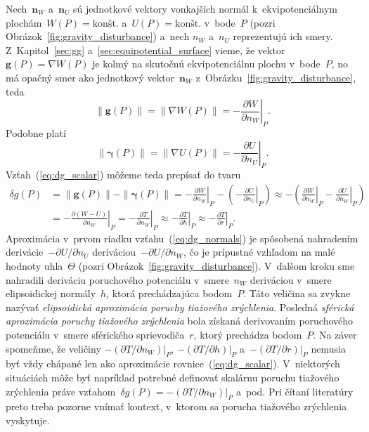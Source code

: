 \documentclass[a4paper, 12pt]{book}
\let\vec\mathbf
\begin{document}
Nech~$\vec n_W$ a~$\vec n_U$ sú jednotkové vektory vonkajších normál 
k~ekvipotenciálnym plochám~$W(P) = \textrm{konšt.}$ a~$U(P) = \textrm{konšt.}$ 
v~bode~$P$ (pozri Obrázok~\ref{fig:gravity_disturbance}) a~nech $n_W$ a~$n_U$ 
reprezentujú ich smery.  Z~Kapitol~\ref{sec:gg} 
a~\ref{sec:equipotential_surface} vieme, že vektor~$\vec g(P) = \nabla W(P)$ je 
kolmý na skutočnú ekvipotenciálnu plochu v~bode~$P$, no má opačný smer ako 
jednotkový vektor~$\vec n_W$ z~Obrázku~\ref{fig:gravity_disturbance}, teda
%
\begin{equation}
\| \vec g(P) \| = \| \nabla W(P) \| = -\left.\frac{\partial W}{\partial 
n_W}\right|_P.
\end{equation}
%
Podobne platí
%
\begin{equation}
\| \boldsymbol \gamma(P) \| = \| \nabla U(P) \| = -\left.\frac{\partial 
U}{\partial n_U}\right|_P.
\end{equation}
%
Vzťah~(\ref{eq:dg_scalar}) môžeme teda prepísať do tvaru
%
\begin{equation}
\label{eq:dg_normals}
\begin{split}
\delta g(P) &= \| \vec g(P) \| - \| \boldsymbol\gamma(P) \| 
= -\left.\frac{\partial W}{\partial n_W}\right|_P - \left( 
- \left.\frac{\partial U}{\partial n_U}\right|_P\right) \approx -\left( 
\left.\frac{\partial W}{\partial n_W}\right|_P - \left.\frac{\partial 
U}{\partial n_W}\right|_P\right)\\
%
&= -\left.\frac{\partial (W - U)}{\partial n_W}\right|_P 
=  -\left.\frac{\partial T}{\partial n_W}\right|_P \approx 
-\left.\frac{\partial T}{\partial h}\right|_P \approx -\left.\frac{\partial 
T}{\partial r}\right|_P{.}
\end{split}
\end{equation}
%
Aproximácia v~prvom riadku vzťahu~(\ref{eq:dg_normals}) je spôsobená nahradením 
derivácie~$-\partial U \slash \partial n_U$ deriváciou~$-\partial U \slash 
\partial n_W$, čo je prípustné vzhľadom na malé hodnoty uhla~$\Theta$ (pozri 
Obrázok~\ref{fig:gravity_disturbance}).  V~ďalšom kroku sme nahradili deriváciu 
poruchového potenciálu v~smere~$n_W$ deriváciou v~smere elipsoidickej 
normály~$h$, ktorá prechádzajúca bodom~$P$.  Táto veličina sa zvykne nazývať 
\emph{elipsoidická aproximácia poruchy tiažového zrýchlenia}.  Posledná 
\emph{sférická aproximácia poruchy tiažového zrýchlenia} bola získaná 
derivovaním poruchového potenciálu v~smere sférického sprievodiča~$r$, ktorý 
prechádza bodom~$P$.  Na záver spomeňme, že veličiny $-\left(\partial T \slash 
\partial n_W\right)|_P$, $-\left(\partial T \slash \partial h\right)|_P$ 
a~$-\left(\partial T \slash \partial r\right)|_P$ nemusia byť vždy chápané len 
ako aproximácie rovnice~(\ref{eq:dg_scalar}).  V~niektorých situáciách môže byť 
napríklad potrebné definovať skalárnu poruchu tiažového zrýchlenia práve 
vzťahom~$\delta g(P) = -\left(\partial T \slash \partial n_W\right)|_P$ a~pod.  
Pri čítaní literatúry preto treba pozorne vnímať kontext, v~ktorom sa porucha 
tiažového zrýchlenia vyskytuje.
\end{document}
